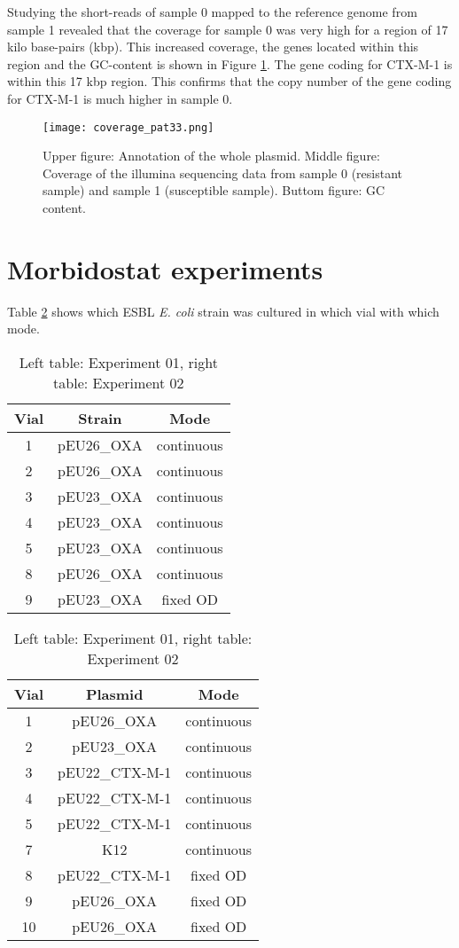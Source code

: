 Studying the short-reads of sample 0 mapped to the reference genome from sample 1 revealed that the coverage for sample 0 was very high for a region of 17 kilo base-pairs (kbp). This increased coverage, the genes located within this region and the GC-content is shown in Figure \ref{figure:coverage}. The gene coding for CTX-M-1 is within this 17 kbp region. This confirms that the copy number of the gene coding for CTX-M-1 is much higher in sample 0.

\begin{figure}[H]
	\texttt{[image: coverage\_pat33.png]}
	\caption{Upper figure: Annotation of the whole plasmid. Middle figure: Coverage of the illumina sequencing data from sample 0 (resistant sample) and sample 1 (susceptible sample). Buttom figure: GC content.}
	\label{figure:coverage}
\end{figure}
\newpage
\newpage
\section{Morbidostat experiments}
Table \ref{table:vial_modes} shows which ESBL \textit{E. coli} strain was cultured in which vial with which mode. 
\begin{table}
	\begin{tabular}{|c c c|}	
		\hline
		Vial & Strain & Mode \\
		\hline
		1 & pEU26\_OXA & continuous \\
		\hline
		2 & pEU26\_OXA & continuous \\
		\hline
		3 & pEU23\_OXA & continuous \\
		\hline
		4 & pEU23\_OXA & continuous \\
		\hline
		5 & pEU23\_OXA & continuous \\
		\hline
		8 & pEU26\_OXA & continuous \\
		\hline
		9 & pEU23\_OXA & fixed OD \\
		\hline
	\end{tabular}
	\quad
	\begin{tabular}{|c c c|}	
		\hline
		Vial & Plasmid & Mode \\
		\hline
		1 & pEU26\_OXA & continuous \\
		\hline
		2 & pEU23\_OXA & continuous \\
		\hline
		3 & pEU22\_CTX-M-1 & continuous \\
		\hline
		4 & pEU22\_CTX-M-1 & continuous \\
		\hline
		5 & pEU22\_CTX-M-1 & continuous \\
		\hline
		7 & K12 & continuous \\
		\hline
		8 & pEU22\_CTX-M-1 & fixed OD \\
		\hline
		9 & pEU26\_OXA & fixed OD \\
		\hline
		10 & pEU26\_OXA & fixed OD \\
		\hline
	\end{tabular}
	\caption{Left table: Experiment 01, right table: Experiment 02}
	\label{table:vial_modes}
\end{table}

